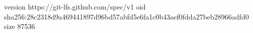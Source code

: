 version https://git-lfs.github.com/spec/v1
oid sha256:28c2318d9a469441897d96bd57abfd5e6fa1c0b43aef0fdda27beb28966adfd0
size 87536
